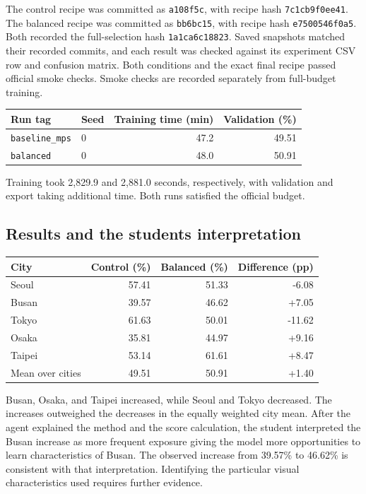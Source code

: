 \documentclass[11pt]{article}
\begin{document}
The control recipe was committed as \texttt{a108f5c}, with recipe hash
\texttt{7c1cb9f0ee41}. The balanced recipe was committed as \texttt{bb6bc15},
with recipe hash \texttt{e7500546f0a5}. Both recorded the full-selection
hash \texttt{1a1ca6c18823}. Saved snapshots matched their recorded commits,
and each result was checked against its experiment CSV row and confusion
matrix. Both conditions and the exact final recipe passed official smoke
checks. Smoke checks are recorded separately from full-budget training.

\begin{center}\small
\begin{tabular}{llrr}
\toprule
Run tag & Seed & Training time (min) & Validation (\%) \\
\midrule
\texttt{baseline\_mps} & 0 & 47.2 & 49.51 \\
\texttt{balanced} & 0 & 48.0 & 50.91 \\
\bottomrule
\end{tabular}
\end{center}

Training took 2,829.9 and 2,881.0 seconds, respectively, with validation and
export taking additional time. Both runs satisfied the official budget.

\subsection{Results and the student\textquotesingle{}s interpretation}

\begin{center}\small
\begin{tabular}{lrrr}
\toprule
City & Control (\%) & Balanced (\%) & Difference (pp) \\
\midrule
Seoul & 57.41 & 51.33 & -6.08 \\
Busan & 39.57 & 46.62 & +7.05 \\
Tokyo & 61.63 & 50.01 & -11.62 \\
Osaka & 35.81 & 44.97 & +9.16 \\
Taipei & 53.14 & 61.61 & +8.47 \\
\midrule
Mean over cities & 49.51 & 50.91 & +1.40 \\
\bottomrule
\end{tabular}
\end{center}

Busan, Osaka, and Taipei increased, while Seoul and Tokyo decreased.
The increases outweighed the decreases in the equally weighted city mean.
After the agent explained the method and the score calculation, the student
interpreted the Busan increase as more frequent exposure giving the model
more opportunities to learn characteristics of Busan. The observed increase
from 39.57\% to 46.62\% is consistent with that interpretation. Identifying
the particular visual characteristics used requires further evidence.
\end{document}
